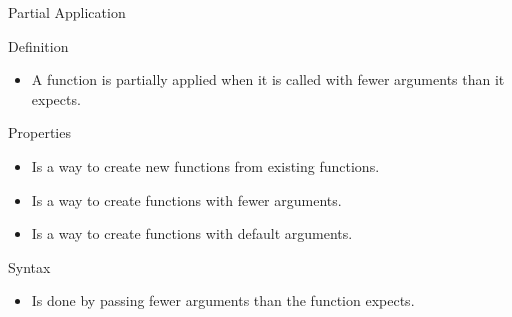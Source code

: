 \begin{frame}{Partial Application}
    \begin{block}{Definition}
        \begin{itemize}
            \item A function is partially applied when it is called with fewer arguments than it expects.
        \end{itemize}
    \end{block}
    \begin{block}{Properties}
        \begin{itemize}
            \item Is a way to create new functions from existing functions.
            \item Is a way to create functions with fewer arguments.
            \item Is a way to create functions with default arguments.
        \end{itemize}
    \end{block}
    \begin{block}{Syntax}
        \begin{itemize}
            \item Is done by passing fewer arguments than the function expects.
        \end{itemize}
    \end{block}
\end{frame}